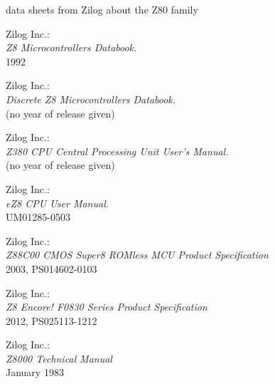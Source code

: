  data sheets from Zilog about the Z80 family

 Zilog Inc.: \\
                {\em Z8 Microcontrollers Databook.\/} \\
                1992

 Zilog Inc.: \\
                  {\em Discrete Z8 Microcontrollers Databook.\/} \\
                  (no year of release given)

 Zilog Inc.: \\
                  {\em Z380 CPU Central Processing Unit User's
                  Manual.\/} \\
                  (no year of release given)

 Zilog Inc.: \\
               {\em eZ8 CPU User Manual.\/} \\
               UM01285-0503

 Zilog Inc.: \\
               {\em Z88C00 CMOS Super8 ROMless MCU Product Specification\/} \\
               2003, PS014602-0103

 Zilog Inc.: \\
               {\em Z8 Encore! F0830 Series Product Specification\/} \\
               2012, PS025113-1212

 Zilog Inc.: \\
               {\em Z8000 Technical Manual\/} \\
               January 1983
